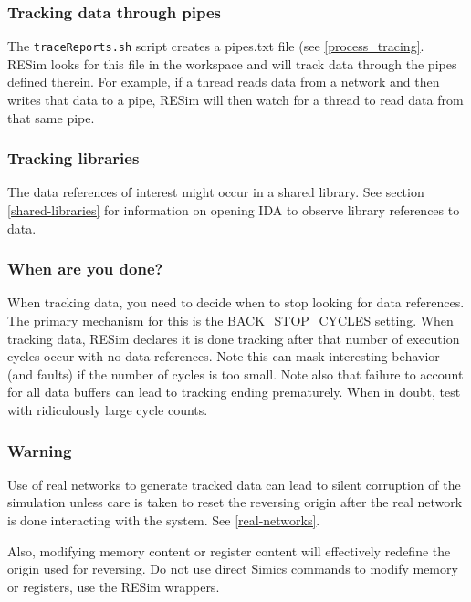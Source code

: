 \documentclass[titlepage]{article}
\begin{document}
\subsubsection{Tracking data through pipes}
The {\tt traceReports.sh} script creates a pipes.txt file (see \ref{process_tracing}.   RESim looks for this file in the workspace and will track data through the
pipes defined therein.  For example, if a thread reads data from a network and then writes that data to a pipe, RESim will then watch for a thread
to read data from that same pipe.

\subsubsection{Tracking libraries}
The data references of interest might occur in a shared library.  See section \ref{shared-libraries} for information on opening IDA to 
observe library references to data.

\subsubsection{When are you done?}
When tracking data, you need to decide when to stop looking for data references.  The primary mechanism for this is the BACK\_STOP\_CYCLES
setting.  When tracking data, RESim declares it is done tracking after that number of execution cycles occur with no data references.
Note this can mask interesting behavior (and faults) if the number of cycles is too small.  Note also that failure to account for all data
buffers can lead to tracking ending prematurely.  When in doubt, test with ridiculously large cycle counts.

\subsubsection{Warning}
Use of real networks to generate tracked data can lead to silent corruption of the simulation unless care is taken to reset the reversing origin
after the real network is done interacting with the system.  See \ref{real-networks}.

Also, modifying memory content or register content will effectively redefine the origin used for reversing.  Do not use direct Simics commands to modify 
memory or registers, use the RESim wrappers.
\end{document}
